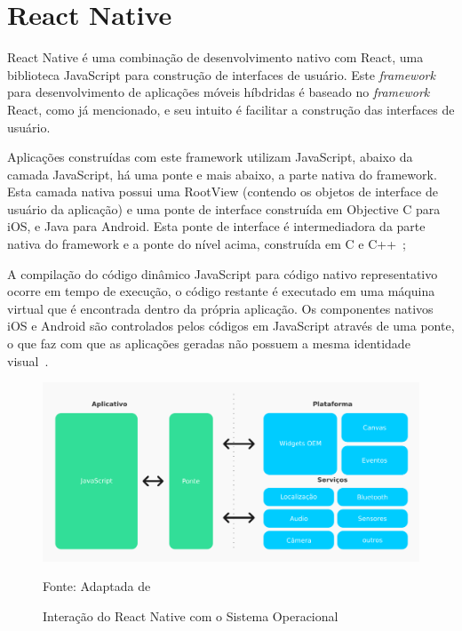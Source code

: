 \section{React Native}\label{sec:react-native}

React Native é uma combinação de desenvolvimento nativo com React, uma biblioteca JavaScript para construção de interfaces de usuário.
Este \textit{framework} para desenvolvimento de aplicações móveis híbdridas é baseado no \textit{framework} React, como já mencionado, e seu intuito é facilitar a construção das interfaces de usuário.

Aplicações construídas com este framework utilizam JavaScript, abaixo da camada JavaScript, há uma ponte e mais abaixo, a parte nativa do framework.
Esta camada nativa possui uma RootView (contendo os objetos de interface de usuário da aplicação) e uma ponte de interface construída em Objective C para iOS, e Java para Android.
Esta ponte de interface é intermediadora da parte nativa do framework e a ponte do nível acima, construída em C e C++~\cite{yatsenko2019comparative};

A compilação do código dinâmico JavaScript para código nativo representativo ocorre em tempo de execução, o código restante é executado em uma máquina virtual que é encontrada dentro da própria aplicação.
Os componentes nativos iOS e Android são controlados pelos códigos em JavaScript através de uma ponte, o que faz com que as aplicações geradas não possuem a mesma identidade visual~\cite{yatsenko2019comparative}.

\begin{figure}[H]
    \centering
    \includegraphics[width=15cm]{imagens/interacaoReactNative}
    \caption{Interação do React Native com o Sistema Operacional}
    Fonte: Adaptada de~\cite{yatsenko2019comparative}
    \label{fig: Interação React Native SO}
\end{figure}

